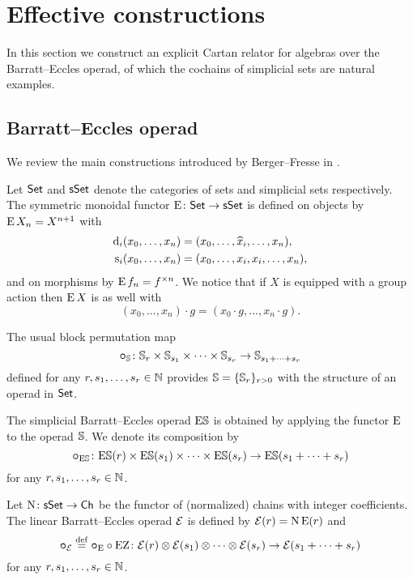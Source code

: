
\section{Effective constructions}

In this section we construct an explicit Cartan relator for algebras over the Barratt--Eccles operad, of which the cochains of simplicial sets are natural examples.

\subsection{Barratt--Eccles operad}

We review the main constructions introduced by Berger--Fresse in \cite{berger2004combinatorial}.

Let $\mathsf{Set}$ and $\mathsf{sSet}$ denote the categories of sets and simplicial sets respectively.
The symmetric monoidal functor $\operatorname{E} \colon \mathsf{Set} \to \mathsf{sSet}$ is defined on objects by $\operatorname{E} X_n = X^{n+1}$ with
\[
\begin{split}
	\operatorname{d}_i(x_0,\dots,x_n) &= (x_0,\dots,\widehat{x}_i,\dots,x_n), \\
	\operatorname{s}_i(x_0,\dots,x_n) &= (x_0, \dots, x_i, x_i, \dots, x_n),
\end{split}
\]
and on morphisms by $\operatorname{E} f_n = f^{\times n}$.
We notice that if $X$ is equipped with a group action then $\operatorname{E} X$ is as well with
\[
(x_0,\dots,x_n) \cdot g = (x_0 \cdot g, \dots, x_n \cdot g).
\]

The usual block permutation map
\[
\bm{\circ}_{\mathbb{S}} \colon \mathbb{S}_r \times \mathbb{S}_{s_1} \times \cdots \times \mathbb{S}_{s_r} \to \mathbb{S}_{s_1+\dots+s_r}
\]
defined for any $r,s_1,\dots,s_r \in \mathbb{N}$ provides $\mathbb{S} = \{\mathbb{S}_r\}_{r>0}$ with the structure of an operad in $\mathsf{Set}$.

The simplicial Barratt--Eccles operad $\mathrm{E}\mathbb{S}$ is obtained by applying the functor $\operatorname{E}$ to the operad $\mathbb{S}$.
We denote its composition by
\[
\bm{\circ}_{\mathrm{E}\mathbb{S}} \colon \mathrm{E}\mathbb{S}(r) \times \mathrm{E}\mathbb{S}(s_1) \times\dots\times \mathrm{E}\mathbb{S}(s_r) \to \mathrm{E}\mathbb{S}(s_1+\dots+s_r)
\]
for any $r,s_1,\dots,s_r \in \mathbb{N}$.

Let $\operatorname{N} \colon \mathsf{sSet} \to \mathsf{Ch}$ be the functor of (normalized) chains with integer coefficients.
The linear Barratt--Eccles operad $\mathcal{E}$ is defined by $\mathcal{E}(r) = \operatorname{N}\operatorname{E}(r)$ and
\[
\bm{\circ}_{\mathcal{E}} \stackrel{\mathrm{def}}{=} \bm{\circ}_{\operatorname{E}} \circ \operatorname{EZ} \colon \mathcal{E}(r) \otimes \mathcal{E}(s_1) \otimes\dotsb\otimes \mathcal{E}(s_r) \to \mathcal{E}(s_1+\dots+s_r)
\]
for any $r,s_1,\dots,s_r \in \mathbb{N}$.


